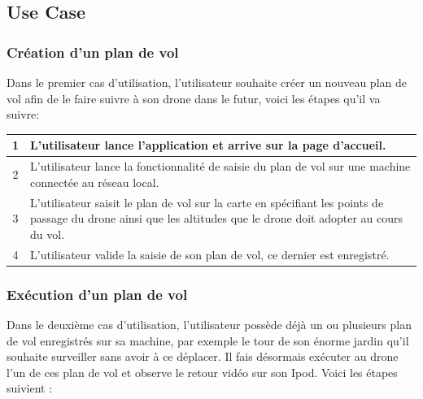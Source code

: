 \documentclass{article}
\begin{document}
	\subsection{Use Case}	
	    \subsubsection{Création d'un plan de vol}
	    Dans le premier cas d'utilisation, l'utilisateur souhaite créer un nouveau plan de vol afin de le faire suivre à son drone dans le futur, voici les étapes qu'il va suivre:
	    
	    \vspace{0.7cm}	     
	    \begin{center}
	    \renewcommand{\arraystretch}{2}
        \begin{tabularx}{15cm}{|c|X|}
            \hline
            1 & L'utilisateur lance l'application et arrive sur la page d'accueil.\\
            \hline
            2 & L'utilisateur lance la fonctionnalité de saisie du plan de vol sur une machine connectée au réseau local.\\
            \hline
            3 & L'utilisateur saisit le plan de vol sur la carte en spécifiant les points de passage du drone ainsi que les altitudes que le drone doit adopter au cours du vol. \\
            \hline
            4 & L'utilisateur valide la saisie de son plan de vol, ce dernier est enregistré. \\
            \hline
        \end{tabularx}
        \end{center}
        
	    \vspace{0.8cm}
	    
	    \subsubsection{Exécution d'un plan de vol}
	    Dans le deuxième cas d’utilisation, l'utilisateur possède déjà un ou plusieurs plan de vol enregistrés sur sa machine, par exemple le tour de son énorme jardin qu'il souhaite surveiller sans avoir à ce déplacer. Il fais désormais exécuter au drone l'un de ces plan de vol et observe le retour vidéo sur son Ipod.
	    Voici les étapes suivient :
	    
\end{document}
